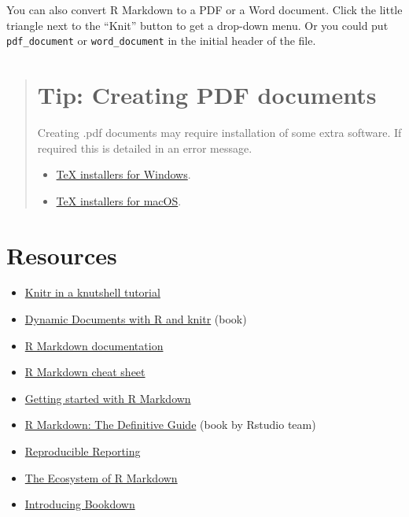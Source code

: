 \documentclass[]{book}
\providecommand{\tightlist}{%
  \setlength{\itemsep}{0pt}\setlength{\parskip}{0pt}}
\begin{document}
You can also convert R Markdown to a PDF or a Word document. Click the
little triangle next to the ``Knit'' button to get a drop-down menu. Or
you could put \texttt{pdf\_document} or \texttt{word\_document} in the
initial header of the file.

\begin{quote}
\section{Tip: Creating PDF documents}\label{tip-creating-pdf-documents}

Creating .pdf documents may require installation of some extra software.
If required this is detailed in an error message.

\begin{itemize}
\tightlist
\item
  \href{https://miktex.org/2.9/setup}{TeX installers for Windows}.
\item
  \href{https://tug.org/mactex}{TeX installers for macOS}.
\end{itemize}
\end{quote}

\section{Resources}\label{resources}

\begin{itemize}
\tightlist
\item
  \href{http://kbroman.org/knitr_knutshell}{Knitr in a knutshell
  tutorial}
\item
  \href{http://www.amazon.com/exec/obidos/ASIN/1482203537/7210-20}{Dynamic
  Documents with R and knitr} (book)
\item
  \href{http://rmarkdown.rstudio.com}{R Markdown documentation}
\item
  \href{https://www.rstudio.com/wp-content/uploads/2016/03/rmarkdown-cheatsheet-2.0.pdf}{R
  Markdown cheat sheet}
\item
  \href{https://www.rstudio.com/resources/webinars/getting-started-with-r-markdown/}{Getting
  started with R Markdown}
\item
  \href{https://bookdown.org/yihui/rmarkdown/}{R Markdown: The
  Definitive Guide} (book by Rstudio team)
\item
  \href{https://www.rstudio.com/resources/webinars/reproducible-reporting/}{Reproducible
  Reporting}
\item
  \href{https://www.rstudio.com/resources/webinars/the-ecosystem-of-r-markdown/}{The
  Ecosystem of R Markdown}
\item
  \href{https://www.rstudio.com/resources/webinars/introducing-bookdown/}{Introducing
  Bookdown}
\end{itemize}


\end{document}
